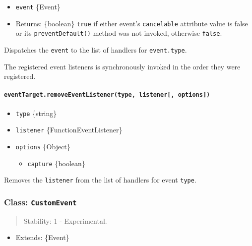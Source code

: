\begin{itemize}
\tightlist
\item
  \texttt{event} \{Event\}
\item
  Returns: \{boolean\} \texttt{true} if either event's
  \texttt{cancelable} attribute value is false or its
  \texttt{preventDefault()} method was not invoked, otherwise
  \texttt{false}.
\end{itemize}

Dispatches the \texttt{event} to the list of handlers for
\texttt{event.type}.

The registered event listeners is synchronously invoked in the order
they were registered.

\paragraph{\texorpdfstring{\texttt{eventTarget.removeEventListener(type,\ listener{[},\ options{]})}}{eventTarget.removeEventListener(type, listener{[}, options{]})}}\label{eventtarget.removeeventlistenertype-listener-options}

\begin{itemize}
\tightlist
\item
  \texttt{type} \{string\}
\item
  \texttt{listener} \{Function\textbar EventListener\}
\item
  \texttt{options} \{Object\}

  \begin{itemize}
  \tightlist
  \item
    \texttt{capture} \{boolean\}
  \end{itemize}
\end{itemize}

Removes the \texttt{listener} from the list of handlers for event
\texttt{type}.

\subsubsection{\texorpdfstring{Class:
\texttt{CustomEvent}}{Class: CustomEvent}}\label{class-customevent}

\begin{quote}
Stability: 1 - Experimental.
\end{quote}

\begin{itemize}
\tightlist
\item
  Extends: \{Event\}
\end{itemize}

